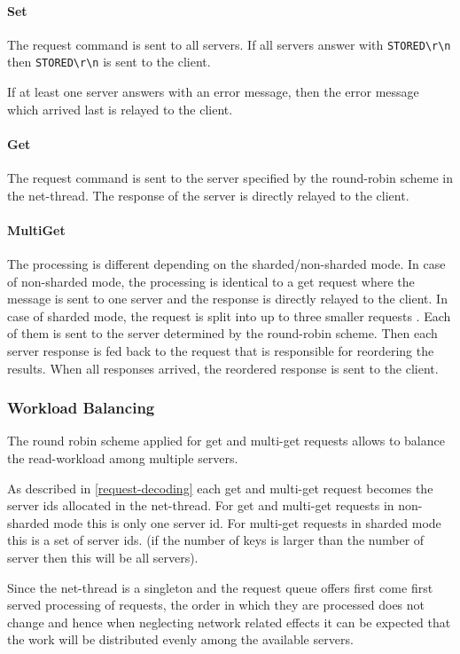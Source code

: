 \documentclass[11pt,a4paper]{article}
\begin{document}
\paragraph{Set} The request command is sent to all servers. If all servers answer with \texttt{STORED\textbackslash r\textbackslash n} then \texttt{STORED\textbackslash r\textbackslash n} is sent to the client. 

If at least one server answers with an error message, then the error message which arrived last is relayed to the client.

\paragraph{Get} The request command is sent to the server specified by the round-robin scheme in the net-thread.
The response of the server is directly relayed to the client.

\paragraph{MultiGet} The processing is different depending on the sharded/non-sharded mode. In case of non-sharded mode, the processing is identical to a get request where the message is sent to one server and the response is directly relayed to the client. In case of sharded mode, the request is split into up to three smaller requests . Each of them is sent to the server determined by the round-robin scheme. Then each server response is fed back to the request that is responsible for reordering the results. When all responses arrived, the reordered response is sent to the client.

\subsubsection{Workload Balancing}\label{workload-balancing}
The round robin scheme applied for get and multi-get requests allows to balance the read-workload among multiple servers.

As described in \ref{request-decoding} each get and multi-get request becomes the server ids allocated in the net-thread.
For get and multi-get requests in non-sharded mode this is only one server id. For multi-get requests in sharded mode this is a set of server ids. (if the number of keys is larger than the number of server then this will be all servers).

Since the net-thread is a singleton and the request queue offers first come first served processing of requests, the order in which they are processed does not change and hence when neglecting network related effects it can be expected that the work will be distributed evenly among the available servers.
\end{document}
